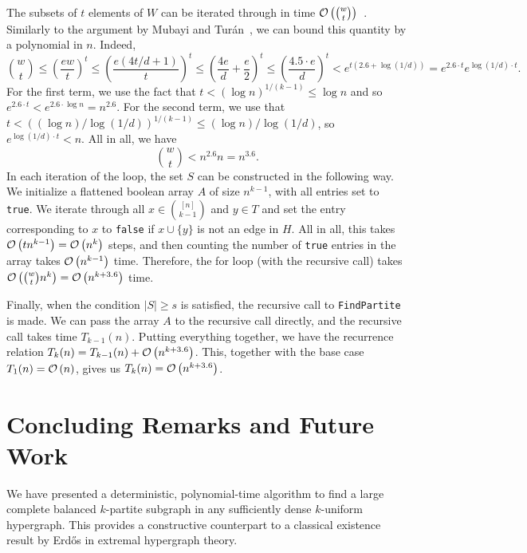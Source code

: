 The subsets of $t$ elements of $W$ can be iterated through in time $\mathcal{O}\left(\binom{w}{t}\right)$~\cite{reingold1977combinatorial}.
Similarly to the argument by Mubayi and Tur\'{a}n~\cite{MUBAYI2010174}, we can bound this quantity by a polynomial in $n$.
Indeed,
\[
    \binom{w}{t} \leq \left(\frac{ew}{t}\right)^t
    \leq \left(\frac{e(4t/d + 1)}{t}\right)^t
    \leq \left(\frac{4e}{d} + \frac{e}{2}\right)^t
    \leq \left(\frac{4.5 \cdot e}{d}\right)^t < e^{t(2.6 + \log (1/d))}
    = e^{2.6 \cdot t} e^{\log (1/d) \cdot t}.
\]
For the first term, we use the fact that $t < (\log n)^{1/(k-1)} \leq \log n$
and so ${e^{2.6 \cdot t} < e^{2.6 \cdot \log n} = n^{2.6}}$.
For the second term, we use that $t < ((\log n)/\log(1/d))^{1/(k-1)} \leq (\log n)/\log(1/d)$,
so $e^{\log (1/d) \cdot t} < n$.
All in all, we have
\[
    \binom{w}{t} < n^{2.6} n = n^{3.6}.
\]
In each iteration of the loop, the set $S$ can be constructed in the following way.
We initialize a flattened boolean array $A$ of size $n^{k-1}$,
with all entries set to \texttt{true}.
We iterate through all $x \in \binom{[n]}{k-1}$ and $y \in T$
and set the entry corresponding to $x$ to \texttt{false} if $x \cup \{y\}$ is not an edge in $H$.
All in all, this takes $\mathcal{O}\left(tn^{k-1}\right) = \mathcal{O}\left(n^k\right)$ steps, and then counting the number of \texttt{true} entries in the array takes $\mathcal{O}\left(n^{k-1}\right)$ time.
Therefore, the for loop (with the recursive call) takes $\mathcal{O}\left(\binom{w}{t} n^{k}\right) = \mathcal{O}\left(n^{k+3.6}\right)$ time.

Finally, when the condition $|S| \geq s$ is satisfied, the recursive call to \texttt{FindPartite} is made.
We can pass the array $A$ to the recursive call directly, and the recursive call takes time $T_{k-1}(n)$.
Putting everything together, we have the recurrence relation $T_k(n) = T_{k-1}(n) + \mathcal{O}\left(n^{k+3.6}\right)$.
This, together with the base case $T_1(n) = \mathcal{O}\left(n\right)$, gives us $T_k(n) = \mathcal{O}\left(n^{k+3.6}\right)$.

\section{Concluding Remarks and Future Work}\label{sec:conclusion-and-future-work}

We have presented a deterministic,
polynomial-time algorithm to find a large complete balanced $k$-partite subgraph in any sufficiently dense $k$-uniform hypergraph.
This provides a constructive counterpart to a classical existence result by Erd\H{o}s in extremal hypergraph theory.

